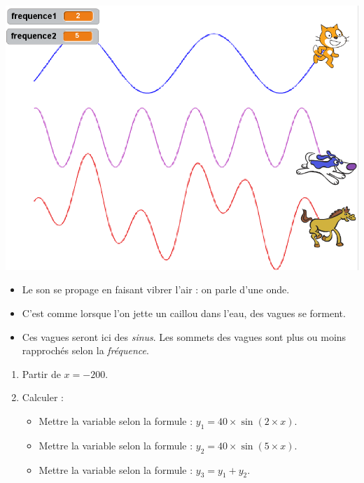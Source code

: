 \documentclass[class=report,crop=false, 12pt]{standalone}
\begin{document}
\begin{activite}

\sauteligne

\begin{center}
  \includegraphics[scale=\scaleecran,scale=0.97]{ecran-09-ex2} 
\end{center}

\begin{itemize}
  \item Le son se propage en faisant vibrer l'air : on parle d'une onde. 
  \item C'est comme lorsque l'on jette un caillou dans l'eau, des vagues se forment.
  \item Ces vagues seront ici des \emph{sinus}. Les sommets des vagues sont plus ou moins rapprochés selon la \emph{fréquence}.
\end{itemize} 


\begin{enumerate}
  \item Partir de $x=-200$.
  
  \item Calculer :
  \begin{itemize}
    \item Mettre la variable  selon la formule : $y_1 = 40 \times \sin(2 \times x)$.
    \item Mettre la variable  selon la formule : $y_2 = 40 \times \sin(5 \times x)$.  
    \item Mettre la variable   selon la formule : $y_3 = y_1+y_2$.    
  \end{itemize}
  

\end{enumerate}
\end{activite}
\end{document}
